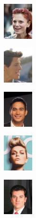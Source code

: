 \documentclass{article}
\begin{document}
\begin{enumerate}
\begin{enumerate}
\begin{figure}[h!]
\begin{minipage}{0.8\textwidth}
						\begin{subfigure}[b]{0.18\textwidth}
							\centering
							\includegraphics[height=1.9cm]{000002}
						\end{subfigure}
						\hfill
						\begin{subfigure}[b]{0.18\textwidth}
							\centering
							\includegraphics[height=1.9cm]{000003}
						\end{subfigure}
						\hfill
						\begin{subfigure}[b]{0.18\textwidth}
							\centering
							\includegraphics[height=1.9cm]{000012}
						\end{subfigure}
						\hfill
						\begin{subfigure}[b]{0.18\textwidth}
							\centering
							\includegraphics[height=1.9cm]{000005}
						\end{subfigure}
						\hfill
						\begin{subfigure}[b]{0.18\textwidth}
							\centering
							\includegraphics[height=1.9cm]{000055}
						\end{subfigure}

						\vspace{0.6cm} %


\end{minipage}
\end{figure}
\end{enumerate}
\end{enumerate}
\end{document}
